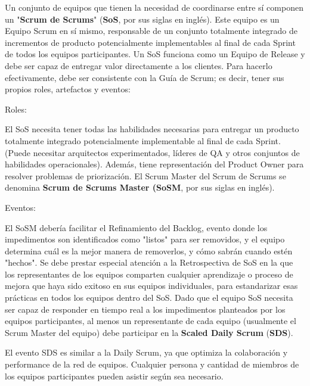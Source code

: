\documentclass{article} %
\begin{document}
\noindent 

\noindent Un conjunto de equipos que tienen la necesidad de coordinarse entre s\'{i} componen un "\textbf{Scrum de Scrums}" (\textbf{SoS}, por sus siglas en ingl\'{e}s). Este equipo es un Equipo Scrum en s\'{i} mismo, responsable de un conjunto totalmente integrado de incrementos de producto potencialmente implementables al final de cada Sprint de todos los equipos participantes. Un SoS funciona como un Equipo de Release y debe ser capaz de entregar valor directamente a los clientes. Para hacerlo efectivamente, debe ser consistente con la Gu\'{i}a de Scrum; es decir, tener sus propios roles, artefactos y eventos:

\noindent 

\noindent Roles:

\noindent El SoS necesita tener todas las habilidades necesarias para entregar un producto totalmente integrado potencialmente implementable al final de cada Sprint. (Puede necesitar arquitectos experimentados, l\'{i}deres de QA y otros conjuntos de habilidades operacionales). Adem\'{a}s, tiene representaci\'{o}n del Product Owner para resolver problemas de priorizaci\'{o}n. El Scrum Master del Scrum de Scrums se denomina \textbf{Scrum de Scrums Master (SoSM}, por sus siglas en ingl\'{e}s).

\noindent Eventos:

\noindent El SoSM deber\'{i}a facilitar el Refinamiento del Backlog, evento donde los impedimentos son identificados como "listos" para ser removidos, y el equipo determina cu\'{a}l es la mejor manera de removerlos, y c\'{o}mo sabr\'{a}n cuando est\'{e}n "hechos". Se debe prestar especial atenci\'{o}n a la Retrospectiva de SoS en la que los representantes de los equipos comparten cualquier aprendizaje o proceso de mejora que haya sido exitoso en sus equipos individuales, para estandarizar esas pr\'{a}cticas en todos los equipos dentro del SoS. Dado que el equipo SoS necesita ser capaz de responder en tiempo real a los impedimentos planteados por los equipos participantes, al menos un representante de cada equipo (usualmente el Scrum Master del equipo)  debe participar en la \textbf{Scaled Daily Scrum} (\textbf{SDS}). 

\noindent 

\noindent El evento SDS es similar a la Daily Scrum, ya que optimiza la colaboraci\'{o}n y performance de la red de equipos. Cualquier persona y cantidad de miembros de los equipos participantes pueden asistir seg\'{u}n sea necesario.
\end{document}
